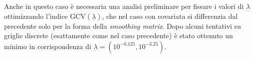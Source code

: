 \documentclass[a4paper,11pt,twoside,openright]{book}							%
\begin{document}
Anche in questo caso è necessaria una analisi preliminare per fissare i valori di $\underline \lambda$ ottimizzando l'indice $\mathrm{GCV}(\underline \lambda)$, che nel caso con covariata si differenzia dal precedente solo per la forma della \textit{smoothing matrix}. Dopo alcuni tentativi su griglie discrete (esattamente come nel caso precedente) è stato ottenuto un minimo in corrispondenza di $\underline \lambda = (10^{-0.125}, 10^{-3.25})$. 
\newpage
\begin{figure}[H]
\centering
{}
\end{figure}
\end{document}
